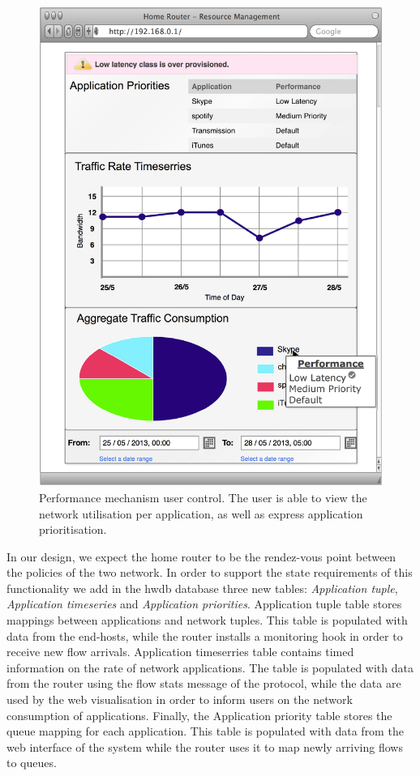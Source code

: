 \begin{figure}
  \centering
  \includegraphics[width=0.8\columnwidth]{homework_intf_qos}
  \caption{\label{fig:homework_intf_qos} Performance mechanism  user control.
    The user is able to view the network utilisation per application, as well as
    express application prioritisation.}
\end{figure}

In our design, we expect the home router to be the rendez-vous point between the
policies of the two network. In order to support the state requirements of this
functionality we add in the hwdb database three new tables: {\it Application
  tuple}, {\it Application timeseries} and {\it Application priorities}.
Application tuple table stores mappings between applications and 
network tuples. This table is populated with data from the end-hosts, while the
router installs a monitoring hook in order to receive new flow arrivals.
Application timeserries table contains timed information on the rate of network
applications. The table is populated with data from the router using the
flow stats message of the \of protocol, while the data are used by the web
visualisation in order to inform users on the network consumption of
applications. Finally, the Application priority table stores the queue mapping
for each application. This table is populated with data from the web interface
of the system while the router uses it to map newly arriving flows to
queues. 

